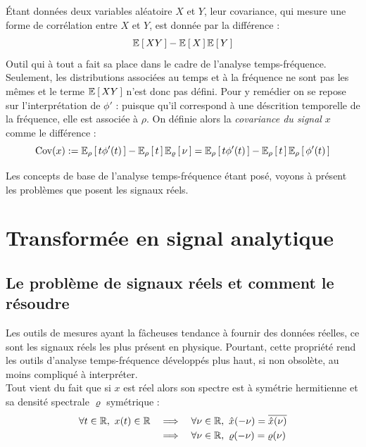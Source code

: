 \begin{definition}[Covariance]\label{def:cova_signal}
	Étant données deux variables aléatoire $X$ et $Y$, leur covariance, qui mesure une forme de corrélation entre $X$ et $Y$, est donnée par la différence :
	\[\esp{XY}-\esp{X}\esp{Y}\]
	Outil qui à tout a fait sa place dans le cadre de l'analyse temps-fréquence. Seulement, les distributions associées au temps et à la fréquence ne sont pas les mêmes et le terme $\esp{XY}$ n'est donc pas défini.
	Pour y remédier on se repose sur l'interprétation de $\phi'$ : puisque qu'il correspond à une déscrition temporelle de la fréquence, elle est associée à $\rho$. On définie alors la \emph{covariance du signal} $x$ comme le différence :
	\begin{equation}\label{eq:cov_signal}
		\text{Cov}(x) \defeq \esp[\rho]{t\phi'(t)} - \esp[\rho]{t} \esp[\varrho]{\nu} = \esp[\rho]{t\phi'(t)} - \esp[\rho]{t} \esp[\rho]{\phi'(t)}
	\end{equation}
\end{definition}

Les concepts de base de l'analyse temps-fréquence étant posé, voyons à présent les problèmes que posent les signaux réels.


\section{Transformée en signal analytique}

\subsection{Le problème de signaux réels et comment le résoudre}


Les outils de mesures ayant la fâcheuses tendance à fournir des données réelles, ce sont les signaux réels les plus présent en physique.
Pourtant, cette propriété rend les outils d'analyse temps-fréquence développés plus haut, si non obsolète, au moins compliqué à interpréter.
\\
Tout vient du fait que si $x$ est réel alors son spectre est à symétrie hermitienne et sa densité spectrale $\varrho$ symétrique :
\begin{align*}
\forall t\in\R,\ x(t)\in\R \quad &\Lr \quad \forall \nu\in\R,\ \hat{x}(-\nu) = \congu{\hat{x}(\nu)} \\
	&\Lr \quad \forall \nu\in\R,\ \varrho(-\nu) = \varrho(\nu)
\end{align*}
\\

